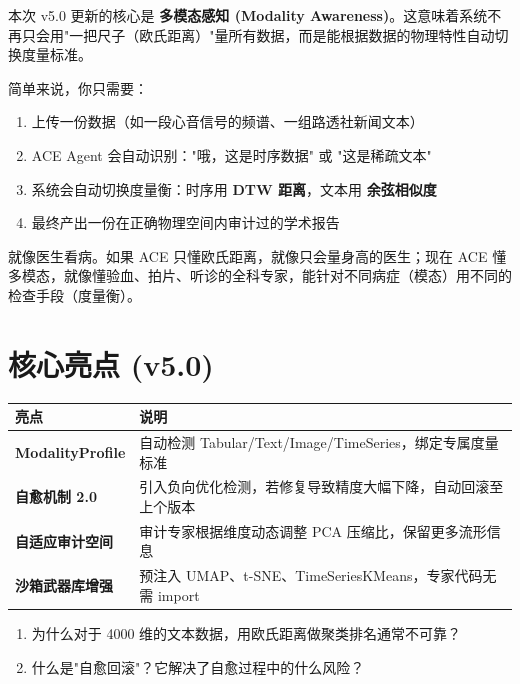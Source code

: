 \documentclass[11pt,a4paper]{ctexbook}
\begin{document}
本次 v5.0 更新的核心是 \textbf{多模态感知 (Modality Awareness)}。这意味着系统不再只会用"一把尺子（欧氏距离）"量所有数据，而是能根据数据的物理特性自动切换度量标准。

简单来说，你只需要：
\begin{enumerate}
    \item 上传一份数据（如一段心音信号的频谱、一组路透社新闻文本）
    \item ACE Agent 会自动识别："哦，这是时序数据" 或 "这是稀疏文本"
    \item 系统会自动切换度量衡：时序用 \textbf{DTW 距离}，文本用 \textbf{余弦相似度}
    \item 最终产出一份在正确物理空间内审计过的学术报告
\end{enumerate}

\begin{plainbox}
    就像医生看病。如果 ACE 只懂欧氏距离，就像只会量身高的医生；现在 ACE 懂多模态，就像懂验血、拍片、听诊的全科专家，能针对不同病症（模态）用不同的检查手段（度量衡）。
\end{plainbox}

\section{核心亮点 (v5.0)}

\begin{longtable}{p{4cm} p{9cm}}
    \toprule
    \textbf{亮点} & \textbf{说明} \\
    \midrule
    \textbf{ModalityProfile} & 自动检测 Tabular/Text/Image/TimeSeries，绑定专属度量标准 \\
    \midrule
    \textbf{自愈机制 2.0} & 引入负向优化检测，若修复导致精度大幅下降，自动回滚至上个版本 \\
    \midrule
    \textbf{自适应审计空间} & 审计专家根据维度动态调整 PCA 压缩比，保留更多流形信息 \\
    \midrule
    \textbf{沙箱武器库增强} & 预注入 UMAP、t-SNE、TimeSeriesKMeans，专家代码无需 import \\
    \bottomrule
\end{longtable}

\begin{reviewbox}
    \begin{enumerate}
        \item 为什么对于 4000 维的文本数据，用欧氏距离做聚类排名通常不可靠？
        \item 什么是"自愈回滚"？它解决了自愈过程中的什么风险？
    \end{enumerate}
\end{reviewbox}
\end{document}
